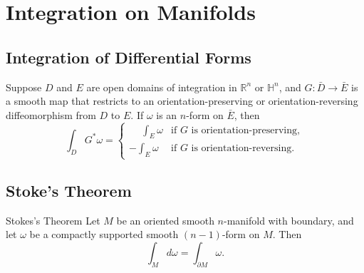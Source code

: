 \documentclass[../main.tex]{subfiles}
\begin{document}
\ifSubfilesClassLoaded{

    
}{}

\chapter{ Integration on Manifolds }

\section{Integration of Differential Forms}

\begin{proposition}{}{}
Suppose $D$ and $E$ are open domains of integration in $\mathbb{R}^n$ or $\mathbb{H}^n$, and $G \colon \bar{D} \to \bar{E}$ is a smooth map that restricts to an orientation-preserving or orientation-reversing diffeomorphism from $D$ to $E$. If $\omega$ is an $n$-form on $\bar{E}$, then
\[
\int_D G^*\omega = \begin{cases} \phantom{-}\displaystyle\int_E \omega & \text{if } G \text{ is orientation-preserving}, \\ -\displaystyle\int_E \omega & \text{if } G \text{ is orientation-reversing}. \end{cases}
\]
\end{proposition}

\section{Stoke's Theorem}

\begin{theorem}{Stokes's Theorem}{}
Let $M$ be an oriented smooth $n$-manifold with boundary, and let $\omega$ be a compactly supported smooth $(n-1)$-form on $M$. Then
\begin{equation}
\int_M d\omega = \int_{\partial M} \omega. 
\end{equation}
\end{theorem}
\end{document}
